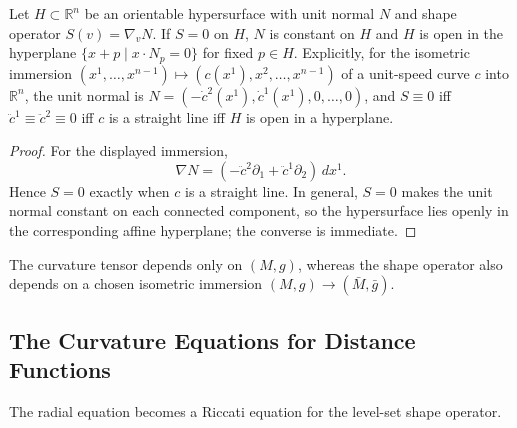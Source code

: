 \begin{example}
  \label{ex:pet-ch3-zero-shape-operator-hyperplane}

  Let $H\subset\mathbb R^n$ be an orientable hypersurface with unit normal $N$
  and shape operator $S(v)=\nabla_vN$. If $S=0$ on $H$, $N$ is constant on $H$
  and $H$ is open in the hyperplane $\{x+p\mid x\cdot N_p=0\}$ for fixed $p\in
  H$. Explicitly, for the isometric immersion
  $(x^1,\dots,x^{n-1})\mapsto(c(x^1),x^2,\dots,x^{n-1})$ of a unit-speed curve $c$
  into $\mathbb R^n$, the unit normal is $N=(-\dot c^2(x^1),\dot c^1(x^1),0,\dots,0)$,
  and $S\equiv0$ iff $\ddot c^1\equiv\ddot c^2\equiv0$ iff $c$ is a straight line
  iff $H$ is open in a hyperplane.
\end{example}
\begin{proof}
  \sketch
  For the displayed immersion,
  \[
   \nabla N=(-\ddot c^2\partial_1+\ddot c^1\partial_2)\,dx^1.
  \]
  Hence $S=0$ exactly when $c$ is a straight line. In general, $S=0$ makes the
  unit normal constant on each connected component, so the hypersurface lies
  openly in the corresponding affine hyperplane; the converse is immediate.
\end{proof}

\begin{remark}
  \label{rem:pet-ch3-intrinsic-extrinsic}


  The curvature tensor depends only on $(M,g)$, whereas the shape operator also
  depends on a chosen isometric immersion
  $(M,g)\to(\bar M,\bar g)$.
\end{remark}

\subsection{The Curvature Equations for Distance Functions}

The radial equation becomes a Riccati equation for the level-set shape
operator.

